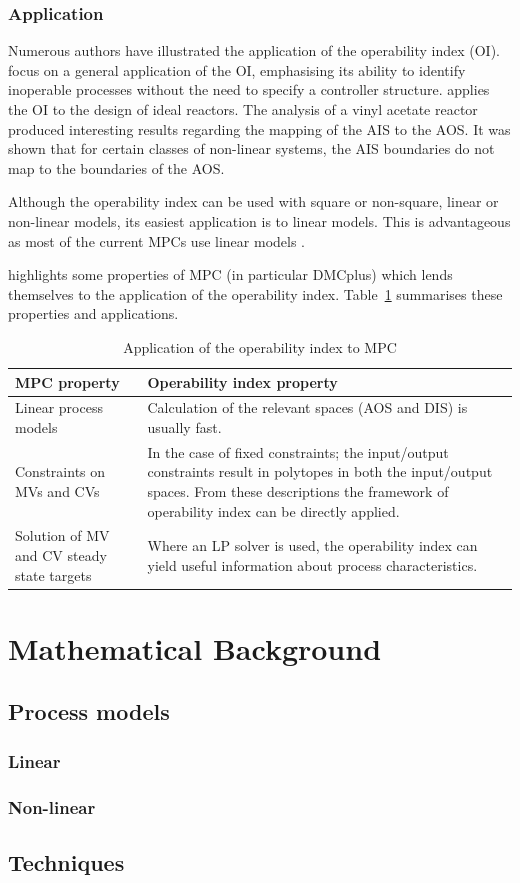 \subsubsection{Application}
Numerous authors have illustrated the application of the operability index (OI). 
\citet{opconproc} focus on a general application of the OI, emphasising its ability to identify inoperable processes without the need to specify a controller structure. 
\citet{opidealrx} applies the OI to the design of ideal reactors. 
The analysis of a vinyl acetate reactor produced interesting results
regarding the mapping of the AIS to the AOS. 
It was shown that for certain classes of non-linear systems, the AIS boundaries do not map to the boundaries of the AOS.

Although the  operability index can be used with square or non-square, linear or non-linear models, its easiest application is to linear models. 
This is advantageous as most of the current MPCs use linear models \citep{vinsonphd}.

\citet{vinsonphd} highlights some properties of MPC (in particular DMCplus) which lends themselves to the  application of the operability index.
Table~\ref{tab:mpcoi} summarises these properties and applications.
\begin{table}[htbp]
  \centering
  \caption[Application of the operability index to MPC]{Application of the
    operability index to MPC \citep{vinsonphd}}
  \label{tab:mpcoi}
    \begin{tabular}{p{6cm} p{9cm}}
      \toprule
      MPC property & Operability index property \\
      \midrule
      Linear process models & Calculation of the relevant spaces (AOS and DIS) is usually fast.\\
      Constraints on MVs and CVs & In the case of fixed constraints; the input/output constraints result in polytopes in both the input/output spaces. 
From these descriptions the framework of operability index can be directly applied.\\
      Solution of MV and CV steady state targets  & Where an LP solver is used, the operability index can yield useful information about process characteristics.\\
      \bottomrule
    \end{tabular}
\end{table}

\section{Mathematical Background}
\subsection{Process models}
\subsubsection{Linear}
\subsubsection{Non-linear}
\subsection{Techniques}
